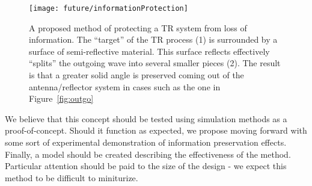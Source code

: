 \begin{figure}[h]
\centering
\texttt{[image: future/informationProtection]}
\caption[Proposed TR information protection system]{A proposed method of protecting a TR system from loss of information. The ``target'' of the TR process (1) is surrounded by a surface of semi-reflective material. This surface reflects effectively ``splits'' the outgoing wave into several smaller pieces (2). The result is that a greater solid angle is preserved coming out of the antenna/reflector system in cases such as the one in Figure~\ref{fig:outgo}}
\label{fig:infoProtection}
\end{figure}

We believe that this concept should be tested using simulation methods as a proof-of-concept. Should it function as expected, we propose moving forward with some sort of experimental demonstration of information preservation effects. Finally, a model should be created describing the effectiveness of the method. Particular attention should be paid to the size of the design - we expect this method to be difficult to miniturize.